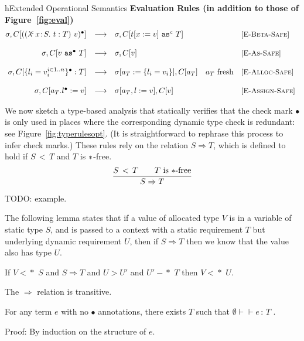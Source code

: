 \documentclass{article}
\newcommand{\safe}{\bullet}
\newcommand{\lam}[5]{\lambda\!^{#1}\,#2\!:\!#3.\,\,#5:#4}
\newcommand{\app}[3]{(#2~#3)^{#1}}
\newcommand{\dynamic}{\t{*}}
\newcommand{\cast}[3]{#2~\t{as}^{#1}~#3}
\newcommand{\subtypeword}{\,<\,}
\newcommand{\subtype}[2]{#1 \subtypeword #2}
\newcommand{\compatible}[2]{#1 \leadsto #2}
\renewcommand{\compatible}[2]{#1 -\!\!\!*\,\, #2}
\newcommand{\comsubtype}[2]{#1 <\!\!\leadsto #2}
\renewcommand{\comsubtype}[2]{#1 <\!\!\!*\,\, #2}
\newcommand{\implies}[2]{#1\Implies #2}
\renewcommand{\t}[1]{{\tt #1}}
\newcommand{\Implies}[0]{\Rightarrow}
\newcommand{\red}[0]{\longrightarrow}  %
\newcommand{\lred}[0]{\red}  %
\newcommand{\judges}[3]{#1\vdash\!\!\!\vdash #2\,:\,#3}
\newcommand{\objty}[1]{\{#1\}}
\newcommand{\obje}[3]{\{#2\}^{#1}:{#3}}
\newcommand{\objv}[1]{\{#1\}}
\newcommand{\objset}[4]{#2.#3^{#1}:=#4}
\begin{document}
\begin{displayfigure}{h}{Extended Operational Semantics}
\label{fig:eval2} 
\footnotesize
{\bf Evaluation Rules (in addition to those of Figure~\ref{fig:eval})}
\[
\begin{array}{@{}rclll}
	\sigma,C[{\app{\safe}{(\lam{c}{x}{S}{T}{t})}{v}}]
	&\lred&
	\sigma,C[\cast{c}{t[x:=v]}{T}]
	&&\rel{E-Beta-Safe}
\\~\\
	\sigma,C[\cast{\safe}{v}{T}]
	&\lred&
	\sigma,C[v]
	&&\rel{E-As-Safe}
\\~\\
	\sigma,C[\obje{\safe}{l_i=v_i^{i\in 1..n}}{T}]
	&\lred&
	\sigma[a_T:=\objv{l_i=v_i}],C[a_T] 
	&\mbox{$a_T$ fresh}
	&\rel{E-Alloc-Safe} 
\\~\\
	\sigma,C[\objset{\safe}{a_T}{l}{v}]
	&\lred&
	\sigma[a_T,l:=v],C[v] 
	& 
	&\rel{E-Assign-Safe} 
\end{array}
\]
 \end{displayfigure} 


We now sketch a type-based analysis that statically verifies that the check mark $\safe$ is only used in places where the
corresponding dynamic type check is redundant: see Figure~\ref{fig:typerulesopt}. (It is straightforward to rephrase this process to infer check marks.)
These rules rely on the relation $S\Implies T$, which is defined to hold if $\subtype S T$ and $T$ is $\dynamic$-free.
\[
\frac{\subtype S T \qquad \mbox{$T$ is $\dynamic$-free}}
	{\implies S T}
\]

TODO: example.

The following lemma states that if a value of allocated type $V$ is in a variable of static type $S$,
and is passed to a context with a static requirement $T$ but underlying dynamic requirement $U$,
then if $\implies S T$ then we know that the value also has type $U$.
 
\begin{lemma}
If $\comsubtype V {S}$ and $S\Implies T$ and $U > U'$ and $\compatible {U'} T$ then $\comsubtype V U$.
\end{lemma}

\begin{lemma}
The $\Implies$ relation is transitive. 
\end{lemma}


\begin{lemma}[No Failure]
For any term $e$ with no $\safe$ annotations, there exists $T$ such that
$\judges{\emptyset}{e}{T}$ .
\end{lemma}
Proof: By induction on the structure of $e$.
\end{document}
